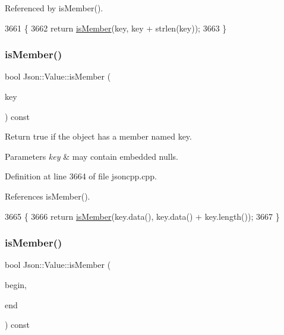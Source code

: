 Referenced by is\+Member().


\begin{DoxyCode}
3661 \{
3662   \textcolor{keywordflow}{return} \hyperlink{class_json_1_1_value_ad6d4df2227321bab05e86667609a7fad}{isMember}(key, key + strlen(key));
3663 \}
\end{DoxyCode}
\mbox{\label{class_json_1_1_value_a0c2cd838217b23ee6bde8135de1b30d9}} 
\subsubsection{\texorpdfstring{is\+Member()}{isMember()}\hspace{0.1cm}{\footnotesize\ttfamily [2/3]}}
{\footnotesize\ttfamily bool Json\+::\+Value\+::is\+Member (\begin{DoxyParamCaption}\item[{const \hyperlink{json_8h_a1e723f95759de062585bc4a8fd3fa4be}{J\+S\+O\+N\+C\+P\+P\+\_\+\+S\+T\+R\+I\+NG} \&}]{key }\end{DoxyParamCaption}) const}

Return true if the object has a member named key. 
\begin{DoxyParams}{Parameters}
{\em key} & may contain embedded nulls. \\
\hline
\end{DoxyParams}


Definition at line 3664 of file jsoncpp.\+cpp.



References is\+Member().


\begin{DoxyCode}
3665 \{
3666   \textcolor{keywordflow}{return} \hyperlink{class_json_1_1_value_ad6d4df2227321bab05e86667609a7fad}{isMember}(key.data(), key.data() + key.length());
3667 \}
\end{DoxyCode}
\mbox{\label{class_json_1_1_value_a2007e1e51f21f44ecf1f13e4a1c567b9}} 
\subsubsection{\texorpdfstring{is\+Member()}{isMember()}\hspace{0.1cm}{\footnotesize\ttfamily [3/3]}}
{\footnotesize\ttfamily bool Json\+::\+Value\+::is\+Member (\begin{DoxyParamCaption}\item[{const char $\ast$}]{begin,  }\item[{const char $\ast$}]{end }\end{DoxyParamCaption}) const}




